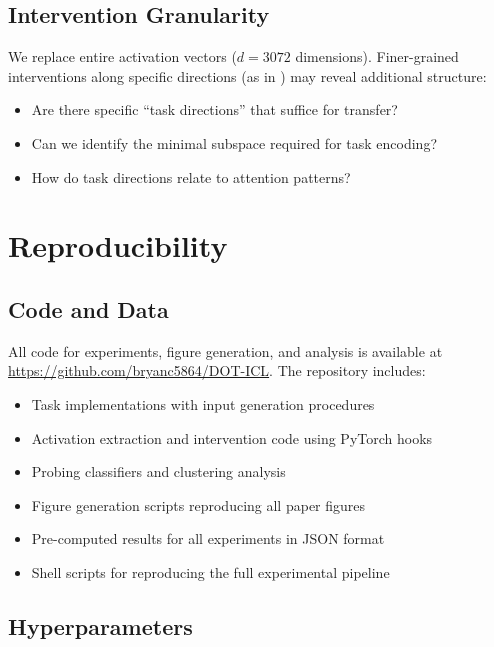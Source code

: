 \documentclass[11pt]{article}
\begin{document}
\subsection{Intervention Granularity}

We replace entire activation vectors ($d=3072$ dimensions). Finer-grained interventions along specific directions (as in \citealp{todd2023function}) may reveal additional structure:
\begin{itemize}
    \item Are there specific ``task directions'' that suffice for transfer?
    \item Can we identify the minimal subspace required for task encoding?
    \item How do task directions relate to attention patterns?
\end{itemize}

\section{Reproducibility}
\label{app:reproducibility}

\subsection{Code and Data}

All code for experiments, figure generation, and analysis is available at \url{https://github.com/bryanc5864/DOT-ICL}. The repository includes:
\begin{itemize}
    \item Task implementations with input generation procedures
    \item Activation extraction and intervention code using PyTorch hooks
    \item Probing classifiers and clustering analysis
    \item Figure generation scripts reproducing all paper figures
    \item Pre-computed results for all experiments in JSON format
    \item Shell scripts for reproducing the full experimental pipeline
\end{itemize}

\subsection{Hyperparameters}
\end{document}
